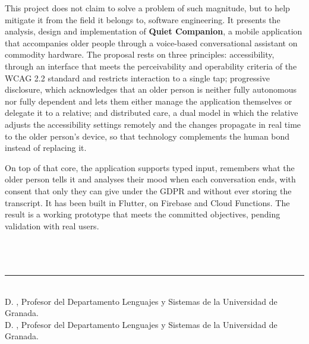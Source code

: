 This project does not claim to solve a problem of such magnitude, but to help mitigate it from the field it
belongs to, software engineering. It presents the analysis, design and implementation of \textbf{Quiet
Companion}, a mobile application that accompanies older people through a voice-based conversational assistant
on commodity hardware. The proposal rests on three principles: accessibility, through an interface
that meets the perceivability and operability criteria of the WCAG 2.2 standard and restricts interaction to a
single tap; progressive disclosure, which acknowledges that an older person is neither fully autonomous nor
fully dependent and lets them either manage the application themselves or delegate it to a relative; and
distributed care, a dual model in which the relative adjusts the accessibility settings remotely and the
changes propagate in real time to the older person's device, so that technology complements the human bond
instead of replacing it.

On top of that core, the application supports typed input, remembers what the older person tells it and
analyses their mood when each conversation ends, with consent that only they can give under the GDPR and
without ever storing the transcript. It has been built in Flutter, on Firebase and Cloud Functions. The
result is a working prototype that meets the committed objectives, pending validation with real users.

\vspace{0.4cm}
\\

\chapter*{}
\thispagestyle{empty}

\noindent\rule[-1ex]{\textwidth}{2pt}\\[4.5ex]

D. \director, Profesor del Departamento Lenguajes y Sistemas de la Universidad de Granada. \\

D. \otrodirector, Profesor del Departamento Lenguajes y Sistemas de la Universidad de Granada. \\

\vspace{0.5cm}


